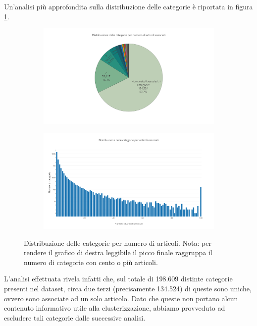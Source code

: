 \documentclass[
	11pt, %
	a4paper, %
	oneside, %
	headinclude,footinclude, %
	BCOR5mm, %
]{scrartcl}
\begin{document}
    Un'analisi più approfondita sulla distribuzione delle categorie è riportata in figura \ref{fig:categories}.
    \begin{figure}[!htb]
		\hspace{-4.5cm}
			\begin{subfigure}{.5\textwidth}
			\centering
			\includegraphics[scale=.5]{Figures/categoriesCake.png}
			\end{subfigure}
		\hspace{0.6cm}
			\begin{subfigure}{.5\textwidth}
			\centering
			\includegraphics[scale=.5]{Figures/categories.png}
			\end{subfigure}
		\caption{Distribuzione delle categorie per numero di articoli. Nota: per rendere il grafico di destra leggibile il picco finale raggruppa il numero di categorie con cento o più articoli.}
		\label{fig:categories}
	\end{figure}

	L'analisi effettuata rivela infatti che, sul totale di 198.609 distinte categorie presenti nel dataset, circa due terzi (precisamente 134.524) di queste sono uniche, ovvero sono associate ad un solo articolo.
	Dato che queste non portano alcun contenuto informativo utile alla clusterizzazione, abbiamo provveduto ad escludere tali categorie dalle successive analisi.
\end{document}
